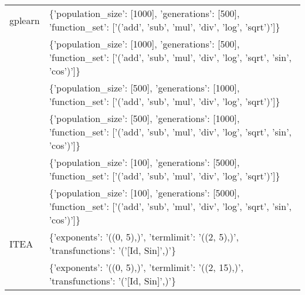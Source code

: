\begin{tabular}{l p{37em}}
      gplearn &                                                                                                                                                                                               \{'population\_size': [1000], 'generations': [500], 'function\_set': ['('add', 'sub', 'mul', 'div', 'log', 'sqrt')']\} \\
              &                                                                                                                                                                                 \{'population\_size': [1000], 'generations': [500], 'function\_set': ['('add', 'sub', 'mul', 'div', 'log', 'sqrt', 'sin', 'cos')']\} \\
              &                                                                                                                                                                                               \{'population\_size': [500], 'generations': [1000], 'function\_set': ['('add', 'sub', 'mul', 'div', 'log', 'sqrt')']\} \\
              &                                                                                                                                                                                 \{'population\_size': [500], 'generations': [1000], 'function\_set': ['('add', 'sub', 'mul', 'div', 'log', 'sqrt', 'sin', 'cos')']\} \\
              &                                                                                                                                                                                               \{'population\_size': [100], 'generations': [5000], 'function\_set': ['('add', 'sub', 'mul', 'div', 'log', 'sqrt')']\} \\
              &                                                                                                                                                                                 \{'population\_size': [100], 'generations': [5000], 'function\_set': ['('add', 'sub', 'mul', 'div', 'log', 'sqrt', 'sin', 'cos')']\} \\
         ITEA &                                                                                                                                                                                                                         \{'exponents': '((0, 5),)', 'termlimit': '((2, 5),)', 'transfunctions': '('[Id, Sin]',)'\} \\
              &                                                                                                                                                                                                                        \{'exponents': '((0, 5),)', 'termlimit': '((2, 15),)', 'transfunctions': '('[Id, Sin]',)'\} \\

\end{tabular}
